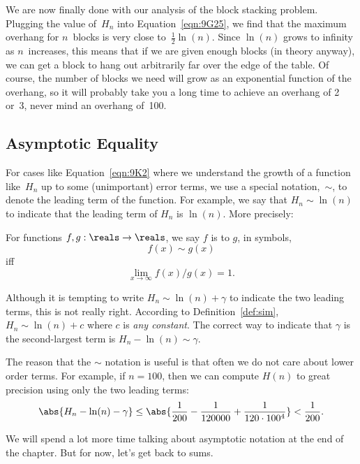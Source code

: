 We are now finally done with our analysis of the block stacking
problem.  Plugging the value of~$H_n$ into Equation~\ref{eqn:9G25}, we
find that the maximum overhang for $n$~blocks is very close
to~$\frac{1}{2} \ln(n)$.  Since $\ln(n)$ grows to infinity as
$n$~increases, this means that if we are given enough blocks (in
theory anyway), we can get a block to hang out arbitrarily far over
the edge of the table.  Of course, the number of blocks we need will
grow as an exponential function of the overhang, so it will probably
take you a long time to achieve an overhang of 2 or~3, never mind an
overhang of~100.

\subsection{Asymptotic Equality}\label{sec:asymptotic_equality}

For cases like Equation~\ref{eqn:9K2} where we understand the growth
of a function like~$H_n$ up to some (unimportant) error terms, we use
a special notation,~$\sim$, to denote the leading term of the
function.  For example, we say that $H_n \sim \ln(n)$ to indicate that
the leading term of $H_n$ is $\ln(n)$.  More precisely:
\begin{definition}\label{def:sim}
  For functions $f,g: \reals \to \reals$, we say $f$ is  to $g$, in symbols,
\[
f(x) \sim g(x)
\]
iff
\[
\lim_{x \rightarrow \infty} f(x)/g(x) = 1.
\]
\end{definition}

Although it is tempting to write $H_n \sim \ln(n) + \gamma$ to indicate
the two leading terms, this is not really right.  According to
Definition~\ref{def:sim}, $H_n \sim \ln(n) + c$ where $c$ is \emph{any
  constant}.  The correct way to indicate that $\gamma$ is the
second-largest term is $H_n - \ln(n) \sim \gamma$.

The reason that the $\sim$ notation is useful is that often we do not care
about lower order terms.  For example, if $n = 100$, then we can compute
$H(n)$ to great precision using only the two leading terms:
\[
\abs{H_n - \ln(n) - \gamma} \leq \abs{\frac{1}{200} - \frac{1}{120000} +
\frac{1}{120 \cdot 100^4}} < \frac{1}{200}.
\]

We will spend a lot more time talking about asymptotic notation at the
end of the chapter.  But for now, let's get back to sums.

\begin{problems}
\classproblems
{}

\homeworkproblems
{}

\end{problems}


